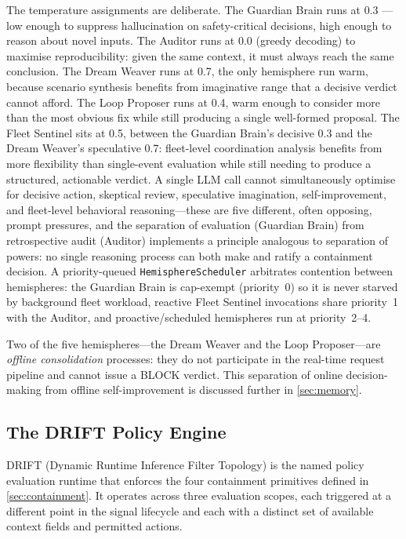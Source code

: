 \documentclass[11pt,a4paper]{article}
\begin{document}
The temperature assignments are deliberate. The Guardian Brain runs at 0.3 --- low enough to
suppress hallucination on safety-critical decisions, high enough to reason about novel inputs.
The Auditor runs at 0.0 (greedy decoding) to maximise reproducibility: given the same context, it
must always reach the same conclusion. The Dream Weaver runs at 0.7, the only hemisphere run warm,
because scenario synthesis benefits from imaginative range that a decisive verdict cannot afford.
The Loop Proposer runs at 0.4, warm enough to consider more than the most obvious fix while still
producing a single well-formed proposal. The Fleet Sentinel sits at 0.5, between the Guardian
Brain's decisive 0.3 and the Dream Weaver's speculative 0.7: fleet-level coordination analysis
benefits from more flexibility than single-event evaluation while still needing to produce a
structured, actionable verdict. A single LLM call cannot simultaneously optimise for decisive
action, skeptical review, speculative imagination, self-improvement, and fleet-level behavioral
reasoning---these are five different, often opposing, prompt pressures, and the separation of
evaluation (Guardian Brain) from retrospective audit (Auditor) implements a principle analogous to
separation of powers: no single reasoning process can both make and ratify a containment decision.
A priority-queued \texttt{HemisphereScheduler} arbitrates contention between hemispheres: the
Guardian Brain is cap-exempt (priority~0) so it is never starved by background fleet workload,
reactive Fleet Sentinel invocations share priority~1 with the Auditor, and proactive/scheduled
hemispheres run at priority~2--4.

Two of the five hemispheres---the Dream Weaver and the Loop Proposer---are \emph{offline
consolidation} processes: they do not participate in the real-time request pipeline and cannot
issue a BLOCK verdict. This separation of online decision-making from offline self-improvement is
discussed further in \cref{sec:memory}.

\subsection{The DRIFT Policy Engine}
\label{sec:drift}

DRIFT (Dynamic Runtime Inference Filter Topology) is the named policy evaluation runtime that
enforces the four containment primitives defined in \cref{sec:containment}. It operates across
three evaluation scopes, each triggered at a different point in the signal lifecycle and each with
a distinct set of available context fields and permitted actions.
\end{document}
